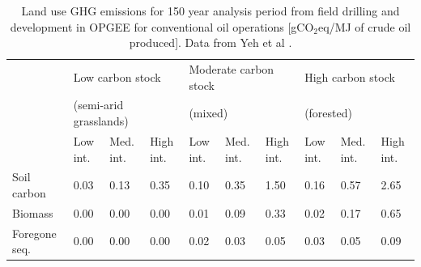 \documentclass[11pt]{report}
\begin{document}
\begin{table}
\begin{scriptsize}
\caption{Land use GHG emissions for 150 year analysis period from field drilling and development in OPGEE for conventional oil operations [gCO$_2$eq/MJ of crude oil produced]. Data from Yeh et al \cite{Yeh2010}.}
\label{tab:default_land_use_emissions}
\begin{tabular}{p{}p{}p{}p{}p{}p{}p{}p{}p{}p{}}
\toprule
& \multicolumn{3}{p{0.25\columnwidth}}{Low carbon stock } & \multicolumn{3}{p{0.25\columnwidth}}{Moderate carbon stock } & \multicolumn{3}{p{0.25\columnwidth}}{High carbon stock}\\
& \multicolumn{3}{p{0.25\columnwidth}}{(semi-arid grasslands)} & \multicolumn{3}{p{0.25\columnwidth}}{(mixed)} & \multicolumn{3}{p{0.25\columnwidth}}{(forested)}\\
\cmidrule{2-4} \cmidrule{5-7} \cmidrule{8-10}
& Low int. & Med. int. & High int. & Low int. & Med. int. & High int. & Low int. & Med. int. & High int.\\
\midrule
Soil carbon & 0.03 & 0.13 & 0.35 & 0.10 & 0.35 & 1.50 & 0.16 & 0.57 & 2.65\\
Biomass & 0.00 & 0.00 & 0.00 & 0.01 & 0.09 & 0.33 & 0.02 & 0.17 & 0.65\\
Foregone seq.\ & 0.00 & 0.00 & 0.00 & 0.02 & 0.03 & 0.05 & 0.03 & 0.05 & 0.09\\
\bottomrule
\end{tabular}
\end{scriptsize}
\end{table}
\end{document}
